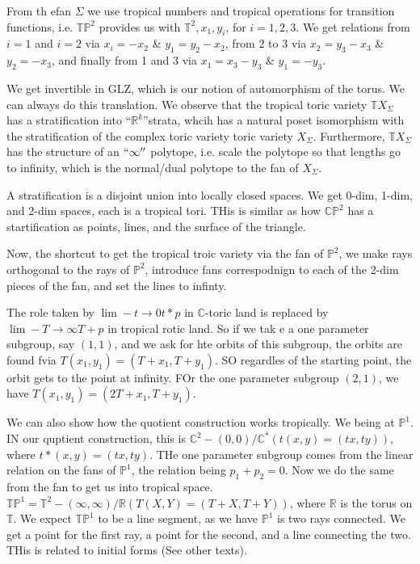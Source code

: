 \documentclass[11pt]{article}
\theoremstyle{definition}
\def\RR{{\mathbb R}}
\def\CC{{\mathbb C}}
\def\TT{{\mathbb T}}
\def\PP{{\mathbb P}}
\begin{document}
From th efan $\Sigma$ we use tropical numbers and tropical operations for transition functions, i.e. $\TT \PP^2$ provides us with $\TT^2, x_1,y_i$, for $i=1,2,3$. We get relations from $i=1$ and $i=2$ via $x_i=-x_2$ \& $y_1=y_2-x_2$, from $2$ to $3$ via $x_2 = y_3-x_3$ \& $y_2 = -x_3$, and finally from 1 and 3 via $x_1 = x_3-y_3$ \& $y_1 = -y_3$.

We get invertible in GLZ, which is our notion of automorphism of the torus. We can always do this translation. We observe that the tropical toric variety $\TT X_\Sigma$ has a stratification into ``$\RR^k$''strata, whcih has a natural poset isomorphism with the stratification of the complex toric variety toric variety $X_\Sigma$. 
Furthermore, $\TT X_\Sigma$ has the structure of an $``\infty''$ polytope, i.e. scale the polytope so that lengths go to infinity, which is the normal/dual polytope to the fan of $X_\Sigma$.

A stratification is a disjoint union into locally closed spaces. We get 0-dim, 1-dim, and 2-dim spaces, each is a tropical tori. THis is similar as how $\CC\PP^2$ has a startification as points, lines, and the surface of the triangle. 



Now, the shortcut to get the tropical troic variety via the fan of $\PP^2$, we make rays orthogonal to the rays of $\PP^2$, introduce fans correspodnign to each of the 2-dim pieces of the fan, and set the lines to infinty.

The role taken by $\lim\limits-{t\rightarrow 0} t*p$ in $\CC$-toric land is replaced by $\lim\limits-{T \rightarrow \infty} T+p$ in tropical rotic land. So if we tak e a one parameter subgroup, say $(1,1)$, and we ask for hte orbits of this subgroup, the orbits are found fvia $T(x_1,y_1) = (T+x_1,T+y_1)$. SO regardles of the starting point, the orbit gets to the point at infinity. FOr the one parameter subgroup $(2,1)$, we have $T(x_1,y_1) = (2T+x_1, T+y_1)$.



We can also show how the quotient construction works tropically. We being at $\PP^1$. IN our quptient construction, this is $\CC^2-(0,0)/\CC^*(t(x,y)=(tx,ty))$, where $t*(x,y)=(tx,ty)$. THe one parameter subgroup comes from the linear relation on the fans of $\PP^1$, the relation being $p_1+p_2=0$. Now we do the same from the fan to get us into tropical space. $\TT\PP^1 = \TT^2 -(\infty, \infty)/\RR (T(X,Y)=(T+X,T+Y))$, where $\RR$ is the torus on $\TT$. We expect $\TT\PP^1$ to be a line segment, as we have $\PP^1$ is two rays connected. We get a point for the first ray, a point for the second, and a line connecting the two. THis is related to initial forms (See other texts).
\end{document}
